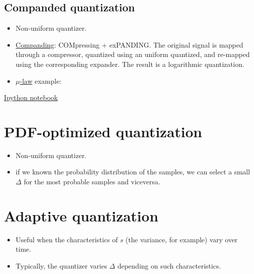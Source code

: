 \subsection{Companded quantization}
\begin{itemize}
\item
  Non-uniform quantizer.
\item
  \href{https://en.wikipedia.org/wiki/Companding}{Companding}:
  COMpressing + exPANDING. The original signal is mapped through a
  compressor, quantized using an uniform quantized, and re-mapped using
  the corresponding expander. The result is a logarithmic quantization.
\item
  \href{https://en.wikipedia.org/wiki/\%CE\%9C-law_algorithm}{\(\mu\)-law}
  example:
\end{itemize}

\href{https://nbviewer.jupyter.org/github/vicente-gonzalez-ruiz/quantization/blob/master/companded_quantization.ipynb}{Ipython notebook}


\section{PDF-optimized quantization}
\begin{itemize}
\item
  Non-uniform quantizer.
\item
  if we known the probability distribution of the samples, we can select
  a small \(\Delta\) for the most probable samples and viceversa.
\end{itemize}


\section{Adaptive quantization}
\begin{itemize}
\item
  Useful when the characteristics of \(s\) (the variance, for example)
  vary over time.
\item
  Typically, the quantizer varies \(\Delta\) depending on such
  characteristics.
\end{itemize}

